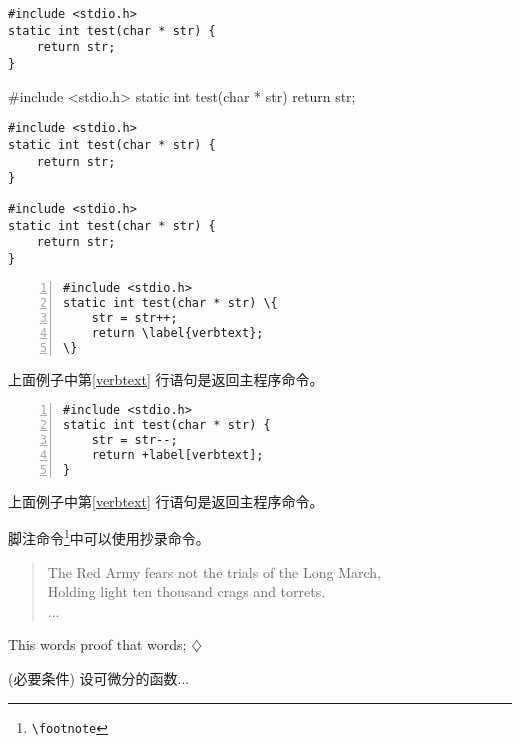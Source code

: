 \documentclass{book}
\begin{document}
\begin{verbatim}
#include <stdio.h>
static int test(char * str) {
	return str;
}
\end{verbatim}
\begin{verbatim*}
#include <stdio.h>
static int test(char * str) {
	return str;
}
\end{verbatim*}
\makeatletter
\renewcommand{\verbatim@font}{\sffamily\slshape\small}
\makeatother
\begin{verbatim}
#include <stdio.h>
static int test(char * str) {
	return str;
}
\end{verbatim}

\begin{Verbatim}
#include <stdio.h>
static int test(char * str) {
	return str;
}
\end{Verbatim}


\begin{Verbatim}[numbers=left,commandchars=\\\{\}]
#include <stdio.h>
static int test(char * str) \{
	str = str++;
	return \label{verbtext};
\}
\end{Verbatim}
上面例子中第\ref{verbtext} 行语句是返回主程序命令。

\begin{Verbatim}[numbers=left,commandchars=+\[\]]
#include <stdio.h>
static int test(char * str) {
	str = str--;
	return +label[verbtext];
}
\end{Verbatim}
上面例子中第\ref{verbtext} 行语句是返回主程序命令。

\VerbatimFootnotes
脚注命令\footnote{\verb"\footnote"}中可以使用抄录命令。

\begin{verse}
The Red Army fears not the trials of the Long March,\\
Holding light ten thousand crags and torrets.\\...\\
\end{verse}

\newenvironment{Proof}{{\noindent \em Proof}\par}{\hfill $\diamondsuit$\par}
\begin{Proof}
This words proof that words;
\end{Proof}

\newenvironment{Theorem}[1][]{\par{}#1\quad}{\par}
\begin{Theorem}[(必要条件)]
设可微分的函数...
\end{Theorem}
\end{document}
